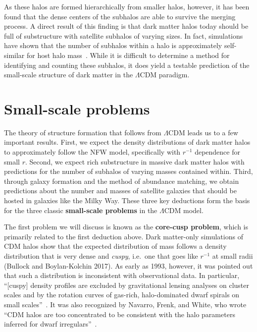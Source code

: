 As these halos are formed hierarchically from smaller halos, however, it
has been found that the dense centers of the subhalos are able to
survive the merging process. A direct result of this finding is that
dark matter halos today should be full of substructure with satellite
subhalos of varying sizes. In fact, simulations have shown that the
number of subhalos within a halo is approximately self-similar for host
halo mass~\cite{bullock_small-scale_2017}. While it is difficult to
determine a method for identifying and counting these subhalos, it does
yield a testable prediction of the small-scale structure of dark matter
in the \(\Lambda\)CDM paradigm.

\hypertarget{small-scale-problems}{%
\section{Small-scale problems}\label{small-scale-problems}}

The theory of structure formation that follows from \(\Lambda\)CDM leads
us to a few important results. First, we expect the density
distributions of dark matter halos to approximately follow the NFW
model, specifically with \(r^{-1}\) dependence for small \(r\). Second,
we expect rich substructure in massive dark matter halos with
predictions for the number of subhalos of varying masses contained
within. Third, through galaxy formation and the method of abundance
matching, we obtain predictions about the number and masses of satellite
galaxies that should be hosted in galaxies like the Milky Way. These
three key deductions form the basis for the three classic
\textbf{small-scale problems} in the \(\Lambda\)CDM model.

The first problem we will discuss is known as the \textbf{core-cusp problem},
which is primarily related to the first deduction above. Dark matter-only
simulations of CDM halos show that the expected distribution of mass follows a
density distribution that is very dense and \emph{cuspy}, i.e.~one that goes
like \(r^{-1}\) at small radii (Bullock and Boylan-Kolchin 2017). As early as
1993, however, it was pointed out that such a distribution is inconsistent
with observational data. In particular, ``{[}cuspy{]} density profiles are
excluded by gravitational lensing analyses on cluster scales and by the
rotation curves of gas-rich, halo-dominated dwarf spirals on small
scales''~\cite{flores_rotation_1993}. It was also recognized by Navarro,
Frenk, and White, who wrote ``CDM halos are too concentrated to be consistent
with the halo parameters inferred for dwarf
irregulars''~\cite{navarro_structure_1995}.

